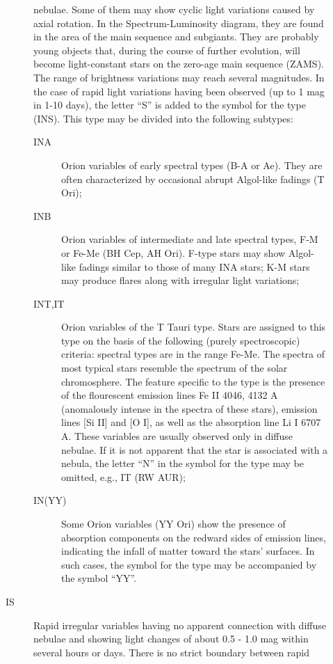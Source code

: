 \begin{description}
\begin{description}
				nebulae. Some of them may show cyclic light variations caused by axial
				rotation. In the Spectrum-Luminosity diagram, they are found in the area
				of the main sequence and subgiants. They are probably young objects
				that, during the course of further evolution, will become light-constant
				stars on the zero-age main sequence (ZAMS). The range of brightness
				variations may reach several magnitudes. In the case of rapid light
				variations having been observed (up to 1 mag in 1-10 days), the letter
				``S'' is added to the symbol for the type (INS). This type may be
				divided into the following subtypes:
		\begin{description}
\item[INA]		Orion variables of early spectral types (B-A or Ae). They
				are often characterized by occasional abrupt Algol-like fadings (T Ori);
\item[INB]		Orion variables of intermediate and late spectral types,
				F-M or Fe-Me (BH Cep, AH Ori). F-type stars may show Algol-like fadings
				similar to those of many INA stars; K-M stars may produce flares along
				with irregular light variations;
\item[INT,IT] 	Orion variables of the T Tauri type. Stars are assigned
				to this type on the basis of the following (purely spectroscopic)
				criteria: spectral types are in the range Fe-Me. The spectra of most
				typical stars resemble the spectrum of the solar chromosphere. The
				feature specific to the type is the presence of the flourescent emission
				lines Fe II 4046, 4132 A (anomalously intense in the spectra of these
				stars), emission lines {[}Si II{]} and {[}O I{]}, as well as the
				absorption line Li I 6707 A. These variables are usually observed only
				in diffuse nebulae. If it is not apparent that the star is associated
				with a nebula, the letter ``N'' in the symbol for the type may be
				omitted, e.g., IT (RW AUR);
\item[IN(YY)] 	Some Orion variables (YY Ori) show the presence of
				absorption components on the redward sides of emission lines, indicating
				the infall of matter toward the stars' surfaces. In such cases, the
				symbol for the type may be accompanied by the symbol
				``YY''.
		\end{description}
\item[IS]		Rapid irregular variables having no apparent connection
				with diffuse nebulae and showing light changes of about 0.5 - 1.0 mag
				within several hours or days. There is no strict boundary between rapid

\end{description}
\end{description}
